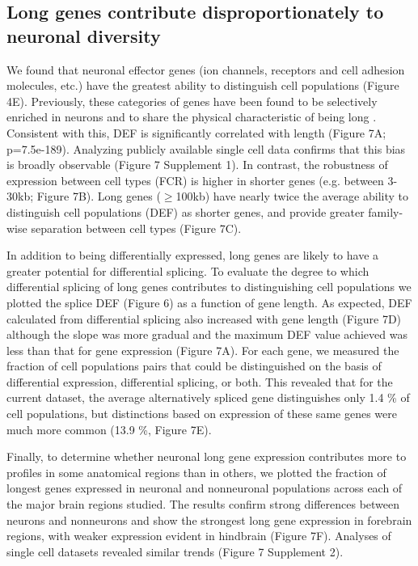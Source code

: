 \subsection{Long genes contribute disproportionately to neuronal diversity}

We found that neuronal effector genes (ion channels, receptors and cell adhesion molecules, etc.) have the greatest ability to distinguish cell populations (Figure 4E). Previously, these categories of genes have been found to be selectively enriched in neurons and to share the physical characteristic of being long \citep{Sugino_2014,Gabel_2015,Zylka_2015}. Consistent with this, DEF is significantly correlated with length (Figure 7A; p=7.5e-189). Analyzing publicly available single cell data confirms that this bias is broadly observable (Figure 7 Supplement 1). In contrast, the robustness of expression between cell types (FCR) is higher in shorter genes (e.g. between 3-30kb; Figure 7B). Long genes ($\geq$100kb) have nearly twice the average ability to distinguish cell populations (DEF) as shorter genes, and provide greater family-wise separation between cell types (Figure 7C).  

In addition to being differentially expressed, long genes are likely to have a greater potential for differential splicing. To evaluate the degree to which differential splicing of long genes contributes to distinguishing cell populations we plotted the splice DEF (Figure 6) as a function of gene length. As expected, DEF calculated from differential splicing also increased with gene length (Figure 7D) although the slope was more gradual and the maximum DEF value achieved was less than that for gene expression (Figure 7A). For each gene, we measured the fraction of cell populations pairs that could be distinguished on the basis of differential expression, differential splicing, or both. This revealed that for the current dataset, the average alternatively spliced gene distinguishes only 1.4 \% of cell populations, but distinctions based on expression of these same genes were much more common (13.9 \%, Figure 7E). 

Finally, to determine whether neuronal long gene expression contributes more to profiles in some anatomical regions than in others, we plotted the fraction of longest genes expressed in neuronal and nonneuronal populations across each of the major brain regions studied. The results confirm strong differences between neurons and nonneurons and show the strongest long gene expression in forebrain regions, with weaker expression evident in hindbrain (Figure 7F). Analyses of single cell datasets revealed similar trends (Figure 7 Supplement 2). 



